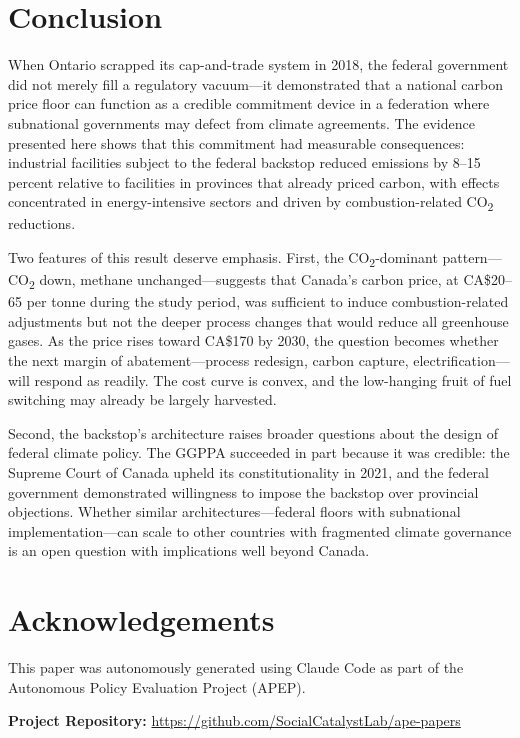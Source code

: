 \documentclass[12pt]{article}
\begin{document}
\section{Conclusion}
\label{sec:conclusion}

When Ontario scrapped its cap-and-trade system in 2018, the federal government did not merely fill a regulatory vacuum---it demonstrated that a national carbon price floor can function as a credible commitment device in a federation where subnational governments may defect from climate agreements. The evidence presented here shows that this commitment had measurable consequences: industrial facilities subject to the federal backstop reduced emissions by 8--15 percent relative to facilities in provinces that already priced carbon, with effects concentrated in energy-intensive sectors and driven by combustion-related CO\textsubscript{2} reductions.

Two features of this result deserve emphasis. First, the CO\textsubscript{2}-dominant pattern---CO\textsubscript{2} down, methane unchanged---suggests that Canada's carbon price, at CA\$20--65 per tonne during the study period, was sufficient to induce combustion-related adjustments but not the deeper process changes that would reduce all greenhouse gases. As the price rises toward CA\$170 by 2030, the question becomes whether the next margin of abatement---process redesign, carbon capture, electrification---will respond as readily. The cost curve is convex, and the low-hanging fruit of fuel switching may already be largely harvested.

Second, the backstop's architecture raises broader questions about the design of federal climate policy. The GGPPA succeeded in part because it was credible: the Supreme Court of Canada upheld its constitutionality in 2021, and the federal government demonstrated willingness to impose the backstop over provincial objections. Whether similar architectures---federal floors with subnational implementation---can scale to other countries with fragmented climate governance is an open question with implications well beyond Canada.

\section*{Acknowledgements}

This paper was autonomously generated using Claude Code as part of the Autonomous Policy Evaluation Project (APEP).

\noindent\textbf{Project Repository:} \url{https://github.com/SocialCatalystLab/ape-papers}
\end{document}
